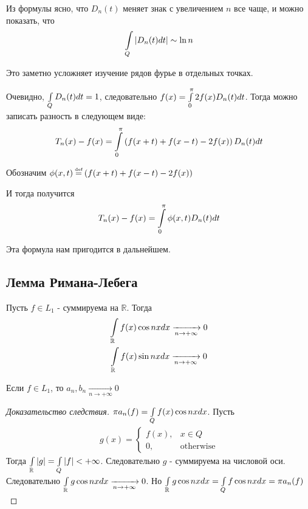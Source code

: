 Из формулы ясно, что $D_n(t)$ меняет знак с увеличением  $n$ все чаще, и можно показать, что 
\begin{gather*}
	\int\limits_{Q} \left|D_n(t) dt\right| \sim \ln n
\end{gather*}

Это заметно усложняет изучение рядов фурье в отдельных точках.

Очевидно, $\int\limits_{Q}D_n(t) dt = 1$, следовательно $f(x) = \int\limits_{0}^{\pi} 2 f(x) D_n(t) dt$.
Тогда можно записать разность в следующем виде:
\begin{gather*}
	T_n(x) - f(x) = \int\limits_{0}^{\pi} \left(f(x + t) + f(x - t) - 2 f(x)\right)D_n(t) dt
\end{gather*}

Обозначим
$\phi(x, t) \defeq \left(f(x + t) + f(x - t) - 2 f(x)\right)$

И тогда получится 
\begin{gather*}
	T_n(x) - f(x) = \int\limits_{0}^{\pi} \phi(x, t) D_n(t) dt
\end{gather*}

Эта формула нам пригодится в дальнейшем.

\subsection{Лемма Римана-Лебега}

\begin{lemma}
	Пусть $f \in L_1$ - суммируема на $\mathbb{R}$. Тогда
	\begin{gather*}
		\int\limits_{\mathbb{R}} f(x) \cos nx dx \xrightarrow[n \rightarrow +\infty]{} 0\\
		\int\limits_{\mathbb{R}}f(x) \sin nx dx  \xrightarrow[n \rightarrow +\infty]{} 0
	\end{gather*}
\end{lemma}

\begin{corollary}
	Если $f \in L_1$, то $a_n, b_n \xrightarrow[n \rightarrow +\infty]{} 0$
\end{corollary}

\begin{proof}[Доказательство следствия]
	$\pi a_n(f) = \int\limits_{Q} f(x)\cos nx dx$. Пусть
	\begin{gather*}
		g(x) = 
		\left\{\begin{matrix}
			f(x), & x\in Q\\
			0,   & \text{otherwise} 
		\end{matrix}\right.
	\end{gather*}
	Тогда $\int\limits_{\mathbb{R}}\left|g\right| = \int\limits_{Q}\left|f\right|<+\infty$. 
	Следовательно $g$ - суммируема на числовой оси. 
	Следовательно $\int\limits_{\mathbb{R}}g \cos nx dx \xrightarrow[n \rightarrow +\infty]{}0$.
	Но $\int\limits_{\mathbb{R}}g \cos nx dx = \int\limits_{Q}f \cos nx dx = \pi a_n(f)$
\end{proof}

